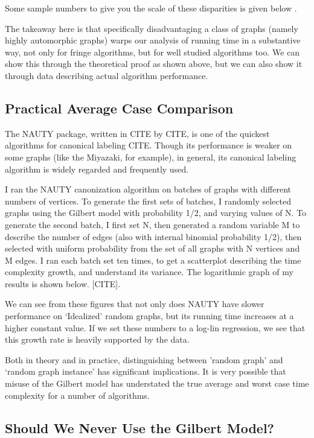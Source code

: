 \documentclass[11pt,a4paper]{report}
\begin{document}
Some sample numbers to give you the scale of these disparities is given below \cite{erdosreyni}.

The takeaway here is that specifically disadvantaging a class of graphs (namely highly automorphic graphs) warps our analysis of running time in a substantive way, not only for fringe algorithms, but for well studied algorithms too.
We can show this through the theoretical proof as shown above, but we can also show it through data describing actual algorithm performance.

\subsection{Practical Average Case Comparison}

The NAUTY package, written in CITE by CITE, is one of the quickest algorithms for canonical labeling CITE.
Though its performance is weaker on some graphs (like the Miyazaki, for example), in general, its canonical labeling algorithm is widely regarded and frequently used.

I ran the NAUTY canonization algorithm on batches of graphs with different numbers of vertices.
To generate the first sets of batches, I randomly selected graphs using the Gilbert model with probability 1/2, and varying values of N.
To generate the second batch, I first set N, then generated a random variable M to describe the number of edges (also with internal binomial probability 1/2), then selected with uniform probability from the set of all graphs with N vertices and M edges.
I ran each batch set ten times, to get a scatterplot describing the time complexity growth, and understand its variance.
The logarithmic graph of my results is shown below.  [CITE].

We can see from these figures that not only does NAUTY have slower performance on `Idealized' random graphs, but its running time increases at a higher constant value.
If we set these numbers to a log-lin regression, we see that this growth rate is heavily supported by the data.

Both in theory and in practice, distinguishing between 'random graph' and `random graph instance' has significant implications.
It is very possible that misuse of the Gilbert model has understated the true average and worst case time complexity for a number of algorithms.

\subsection{Should We Never Use the Gilbert Model?}
\end{document}
